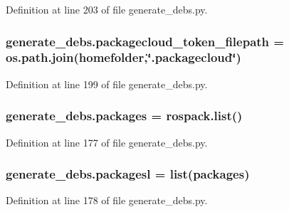 Definition at line 203 of file generate\+\_\+debs.\+py.

\subsubsection[{\texorpdfstring{packagecloud\+\_\+token\+\_\+filepath}{packagecloud_token_filepath}}]{\setlength{\rightskip}{0pt plus 5cm}generate\+\_\+debs.\+packagecloud\+\_\+token\+\_\+filepath = os.\+path.\+join({\bf homefolder},\char`\"{}.packagecloud\char`\"{})}\hypertarget{namespacegenerate__debs_a836a20b989c3c8e46255d91d10cb524f}{}\label{namespacegenerate__debs_a836a20b989c3c8e46255d91d10cb524f}


Definition at line 199 of file generate\+\_\+debs.\+py.

\subsubsection[{\texorpdfstring{packages}{packages}}]{\setlength{\rightskip}{0pt plus 5cm}generate\+\_\+debs.\+packages = rospack.\+list()}\hypertarget{namespacegenerate__debs_a40d4732827c5678f3f48354238245e1d}{}\label{namespacegenerate__debs_a40d4732827c5678f3f48354238245e1d}


Definition at line 177 of file generate\+\_\+debs.\+py.

\subsubsection[{\texorpdfstring{packagesl}{packagesl}}]{\setlength{\rightskip}{0pt plus 5cm}generate\+\_\+debs.\+packagesl = list({\bf packages})}\hypertarget{namespacegenerate__debs_acac340506bc1d8ca0d0881b9c00bfea2}{}\label{namespacegenerate__debs_acac340506bc1d8ca0d0881b9c00bfea2}


Definition at line 178 of file generate\+\_\+debs.\+py.

